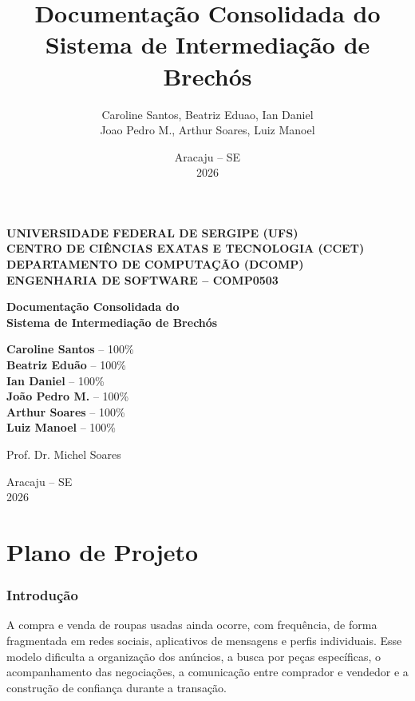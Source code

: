 ﻿\documentclass[12pt,a4paper]{article}
\title{\textbf{Documenta\c{c}\~ao Consolidada do\\Sistema de Intermedia\c{c}\~ao de Brech\'os}}
\author{Caroline Santos, Beatriz Eduao, Ian Daniel\\Joao Pedro M., Arthur Soares, Luiz Manoel}
\date{Aracaju -- SE\\2026}
\begin{document}
\begin{titlepage}
\centering

\textbf{UNIVERSIDADE FEDERAL DE SERGIPE (UFS)}\\
\textbf{CENTRO DE CI\^ENCIAS EXATAS E TECNOLOGIA (CCET)}\\
\textbf{DEPARTAMENTO DE COMPUTA\c{C}\~AO (DCOMP)}\\
\textbf{ENGENHARIA DE SOFTWARE -- COMP0503}\\

\vspace{3cm}

{\LARGE \textbf{Documenta\c{c}\~ao Consolidada do\\Sistema de Intermedia\c{c}\~ao de Brech\'os}}\\

\vspace{3cm}

\textbf{Caroline Santos} -- 100\%\\
\textbf{Beatriz Eduão} -- 100\%\\
\textbf{Ian Daniel} -- 100\%\\
\textbf{João Pedro M.} -- 100\%\\
\textbf{Arthur Soares} -- 100\%\\
\textbf{Luiz Manoel} -- 100\%\\

\vspace{2cm}

Prof. Dr. Michel Soares\\

\vfill

Aracaju -- SE\\
2026

\end{titlepage}

\tableofcontents
\clearpage

\part{Plano de Projeto}
\section{Introdução}
A compra e venda de roupas usadas ainda ocorre, com frequência, de forma fragmentada em redes sociais, aplicativos de mensagens e perfis individuais. Esse modelo dificulta a organização dos anúncios, a busca por peças específicas, o acompanhamento das negociações, a comunicação entre comprador e vendedor e a construção de confiança durante a transação.
\end{document}
